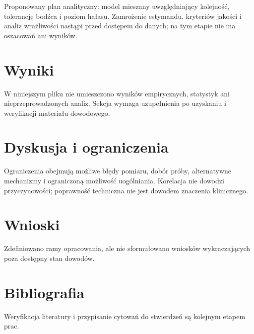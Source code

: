 \documentclass[11pt,a4paper]{article}
\begin{document}
Proponowany plan analityczny: model mieszany uwzględniający kolejność, tolerancję bodźca i poziom hałasu. Zamrożenie estymandu, kryteriów jakości i analiz wrażliwości nastąpi przed dostępem do danych; na tym etapie nie ma oszacowań ani wyników.

\section{Wyniki}

W niniejszym pliku nie umieszczono wyników empirycznych, statystyk ani nieprzeprowadzonych analiz. Sekcja wymaga uzupełnienia po uzyskaniu i weryfikacji materiału dowodowego.

\section{Dyskusja i ograniczenia}

Ograniczenia obejmują możliwe błędy pomiaru, dobór próby, alternatywne mechanizmy i ograniczoną możliwość uogólniania. Korelacja nie dowodzi przyczynowości; poprawność techniczna nie jest dowodem znaczenia klinicznego.

\section{Wnioski}

Zdefiniowano ramy opracowania, ale nie sformułowano wniosków wykraczających poza dostępny stan dowodów.

\section*{Bibliografia}

Weryfikacja literatury i przypisanie cytowań do stwierdzeń są kolejnym etapem prac.
\end{document}

